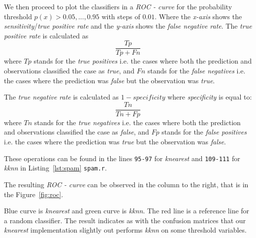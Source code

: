 \documentclass[a4paper, twocolumn]{article}
\begin{document}
    We then proceed to plot the classifiers in a \textit{ROC - curve} for the probability threshold \( p(x) > 0.05,...,0.95\) with steps of \(0.01\). Where the \emph{x-axis} shows the \emph{sensitivity}/\emph{true positive rate} and the \emph{y-axis} shows the \emph{false negative rate}. 
The \textit{true positive rate} is calculated as
\begin{equation}
 \frac{Tp}{Tp + Fn}
\end{equation}
where \(Tp\) stands for the \textit{true positives} i.e. the cases where both the prediction and observations classified the case as \textit{true}, and \(Fn\) stands for the \textit{false negatives} i.e. the cases where the prediction was \textit{false} but the observation was \textit{true}.

The \textit{true negative rate} is calculated as \(1 - specificity\) where \textit{specificity} is equal to:
\begin{equation}
 \frac{Tn}{Tn + Fp}
\end{equation}
where \(Tn\) stands for the \textit{true negatives} i.e. the cases where both the prediction and observations classified the case as \textit{false}, and \(Fp\) stands for the \textit{false positives} i.e. the cases where the prediction was \textit{true} but the observation was \textit{false}.

These operations can be found in the lines \texttt{95-97} for \emph{knearest} and \texttt{109-111} for \emph{kknn} in Listing~\ref{lst:spam} \texttt{spam.r}.

    The resulting \textit{ROC - curve} can be observed in the column to the right, that is in the Figure~\ref{fig:roc}.

    Blue curve is \textit{knearest} and green curve is \textit{kknn}. The red line is a reference line for a random classifier. The result indicates as with the confusion matrices that our \textit{knearest} implementation slightly out performs \textit{kknn} on some threshold variables.
\end{document}
